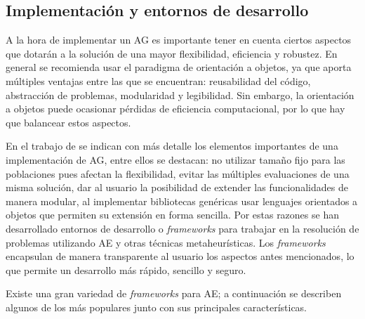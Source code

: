 \subsection{Implementación y entornos de desarrollo}

A la hora de implementar un AG es importante tener en cuenta ciertos aspectos que dotarán a la solución de una mayor flexibilidad, eficiencia y robustez. En general se recomienda usar el paradigma de orientación a objetos, ya que aporta múltiples ventajas entre las que se encuentran: reusabilidad del código, abstracción de problemas, modularidad y legibilidad. Sin embargo, la orientación a objetos puede ocasionar pérdidas de eficiencia computacional, por lo que hay que balancear estos aspectos.

En el trabajo de \citet{Alba1997} se indican con más detalle los elementos importantes de una implementación de AG, entre ellos se destacan: no utilizar tamaño fijo para las poblaciones pues afectan la flexibilidad, evitar las múltiples evaluaciones de una misma solución, dar al usuario la posibilidad de extender las funcionalidades de manera modular, al implementar bibliotecas genéricas usar lenguajes orientados a objetos que permiten su extensión en forma sencilla. Por estas razones se han desarrollado entornos de desarrollo o \emph{frameworks} para trabajar en la resolución de problemas utilizando AE y otras técnicas metaheurísticas. Los \emph{frameworks} encapsulan de manera transparente al usuario los aspectos antes mencionados, lo que permite un desarrollo más rápido, sencillo y seguro.

Existe una gran variedad de \emph{frameworks} para AE; a continuación se describen algunos de los más populares junto con sus principales características.

